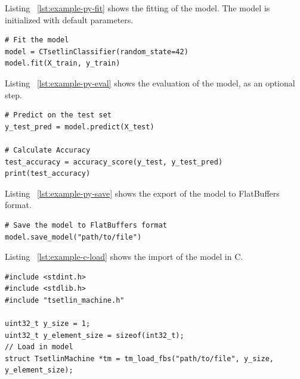 Listing ~\ref{lst:example-py-fit} shows the fitting of the model. The model is initialized with default parameters.

\begin{listing}[!htbp]
    \caption{Example Python model fitting\label{lst:example-py-fit}}
    \begin{verbatim}
# Fit the model
model = CTsetlinClassifier(random_state=42)
model.fit(X_train, y_train)
    \end{verbatim}
\end{listing}
\FloatBarrier

Listing ~\ref{lst:example-py-eval} shows the evaluation of the model, as an optional step.

\begin{listing}[!htbp]
    \caption{Example Python model evaluation\label{lst:example-py-eval}}
    \begin{verbatim}
# Predict on the test set
y_test_pred = model.predict(X_test)

# Calculate Accuracy
test_accuracy = accuracy_score(y_test, y_test_pred)
print(test_accuracy)
    \end{verbatim}
\end{listing}
\FloatBarrier

Listing ~\ref{lst:example-py-save} shows the export of the model to FlatBuffers format.

\begin{listing}[!htbp]
    \caption{Example Python model export to FlatBuffers format\label{lst:example-py-save}}
    \begin{verbatim}
# Save the model to FlatBuffers format
model.save_model("path/to/file")
    \end{verbatim}
\end{listing}
\FloatBarrier

Listing ~\ref{lst:example-c-load} shows the import of the model in C.

\begin{listing}[!htbp]
    \caption{Example C model import\label{lst:example-c-load}}
    \begin{verbatim}
#include <stdint.h>
#include <stdlib.h>
#include "tsetlin_machine.h"

uint32_t y_size = 1;
uint32_t y_element_size = sizeof(int32_t);
// Load in model
struct TsetlinMachine *tm = tm_load_fbs("path/to/file", y_size, y_element_size);
    \end{verbatim}
\end{listing}
\FloatBarrier

